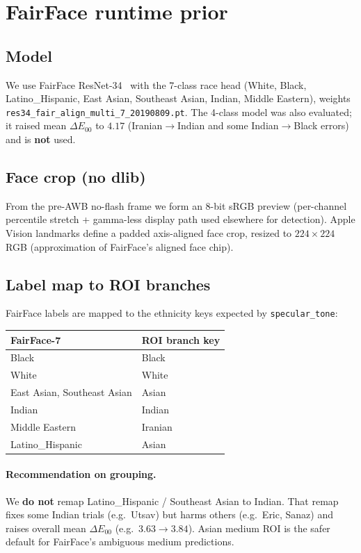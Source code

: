 \documentclass[11pt]{article}
\newcommand{\deee}{\ensuremath{\Delta E_{00}}}
\begin{document}
\section{FairFace runtime prior}
\label{sec:fairface}

\subsection{Model}
We use FairFace ResNet-34~\cite{karkkainen2021fairface} with the 7-class race head
(White, Black, Latino\_Hispanic, East Asian, Southeast Asian, Indian, Middle Eastern),
weights \texttt{res34\_fair\_align\_multi\_7\_20190809.pt}.
The 4-class model was also evaluated; it raised mean $\deee$ to $\num{4.17}$ (Iranian$\to$Indian and some Indian$\to$Black errors) and is \textbf{not} used.

\subsection{Face crop (no dlib)}
From the pre-AWB no-flash frame we form an 8-bit sRGB preview (per-channel percentile stretch + gamma-less display path used elsewhere for detection).
Apple Vision landmarks define a padded axis-aligned face crop, resized to $224{\times}224$ RGB (approximation of FairFace's aligned face chip).

\subsection{Label map to ROI branches}
FairFace labels are mapped to the ethnicity keys expected by \texttt{specular\_tone}:
\begin{center}
\begin{tabular}{ll}
\toprule
FairFace-7 & ROI branch key \\
\midrule
Black & Black \\
White & White \\
East Asian, Southeast Asian & Asian \\
Indian & Indian \\
Middle Eastern & Iranian \\
Latino\_Hispanic & Asian \\
\bottomrule
\end{tabular}
\end{center}
\paragraph{Recommendation on grouping.}
We \textbf{do not} remap Latino\_Hispanic / Southeast Asian to Indian.
That remap fixes some Indian trials (e.g.\ Utsav) but harms others (e.g.\ Eric, Sanaz) and raises overall mean $\deee$ (e.g.\ $\num{3.63}\to\num{3.84}$).
Asian medium ROI is the safer default for FairFace's ambiguous medium predictions.
\end{document}
